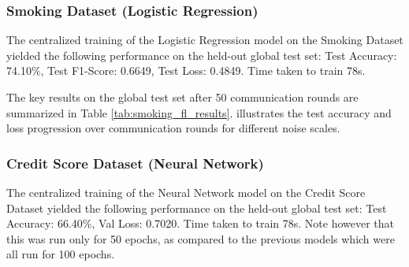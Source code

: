 \documentclass[10pt,twocolumn]{article}
\begin{document}
\begin{table}[hbtp]
  \centering
  \caption{FL Performance on Lumpy Skin Dataset (50 Rounds)}
  \label{tab:lumpy_fl_results}
\end{table}

\subsubsection{Smoking Dataset (Logistic Regression)}
The centralized training of the Logistic Regression model on the Smoking Dataset yielded the following performance on the held-out global test set: Test Accuracy: 74.10\%, Test F1-Score: 0.6649, Test Loss: 0.4849. Time taken to train 78s. 

The key results on the global test set after 50 communication rounds are summarized in Table \ref{tab:smoking_fl_results}. illustrates the test accuracy and loss progression over communication rounds for different noise scales.

\begin{table}[hbtp]
  \centering
  \caption{FL Performance on Smoking Dataset (50 Rounds)}
  \label{tab:smoking_fl_results}
\end{table}

\subsubsection{Credit Score Dataset (Neural Network)}
The centralized training of the Neural Network model on the Credit Score Dataset yielded the following performance on the held-out global test set: Test Accuracy: 66.40\%, Val Loss: 0.7020. Time taken to train 78s. Note however that this was run only for 50 epochs, as compared to the previous models which were all run for 100 epochs. 
\end{document}
